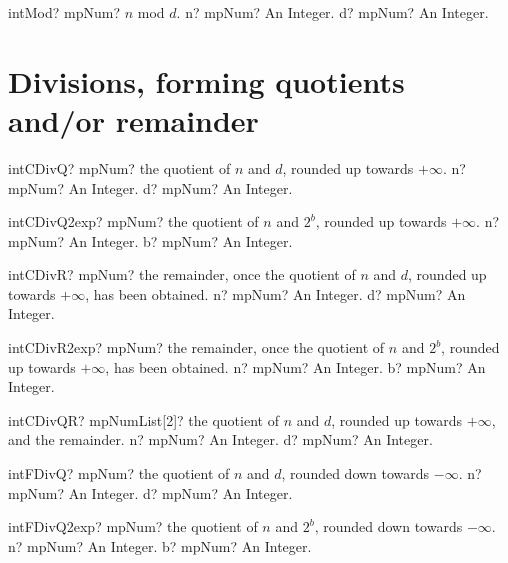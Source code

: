 \documentclass[12pt,a4paper,openany]{book}
\begin{document}
\begin{mpFunctionsExtract}
\mpFunctionTwo
{intMod? mpNum? $n$ mod $d$.}
{n? mpNum? An Integer.}
{d? mpNum? An Integer.}
\end{mpFunctionsExtract}

\section{Divisions, forming quotients and/or remainder}

\begin{mpFunctionsExtract}
\mpFunctionTwo
{intCDivQ? mpNum? the quotient of $n$ and $d$, rounded up towards $+\infty$.}
{n? mpNum? An Integer.}
{d? mpNum? An Integer.}
\end{mpFunctionsExtract}

\begin{mpFunctionsExtract}
\mpFunctionTwo
{intCDivQ2exp? mpNum? the quotient of $n$ and $2^b$, rounded up towards $+\infty$.}
{n? mpNum? An Integer.}
{b? mpNum? An Integer.}
\end{mpFunctionsExtract}

\begin{mpFunctionsExtract}
\mpFunctionTwo
{intCDivR? mpNum? the remainder, once the quotient of $n$ and $d$, rounded up towards $+\infty$, has been obtained.}
{n? mpNum? An Integer.}
{d? mpNum? An Integer.}
\end{mpFunctionsExtract}

\begin{mpFunctionsExtract}
\mpFunctionTwo
{intCDivR2exp? mpNum? the remainder, once the quotient of $n$ and $2^b$, rounded up towards $+\infty$, has been obtained.}
{n? mpNum? An Integer.}
{b? mpNum? An Integer.}
\end{mpFunctionsExtract}

\begin{mpFunctionsExtract}
\mpFunctionTwo
{intCDivQR? mpNumList[2]? the quotient of $n$ and $d$, rounded up towards $+\infty$, and the remainder.}
{n? mpNum? An Integer.}
{d? mpNum? An Integer.}
\end{mpFunctionsExtract}

\begin{mpFunctionsExtract}
\mpFunctionTwo
{intFDivQ? mpNum? the quotient of $n$ and $d$, rounded down towards $-\infty$.}
{n? mpNum? An Integer.}
{d? mpNum? An Integer.}
\end{mpFunctionsExtract}

\begin{mpFunctionsExtract}
\mpFunctionTwo
{intFDivQ2exp? mpNum? the quotient of $n$ and $2^b$, rounded down towards $-\infty$.}
{n? mpNum? An Integer.}
{b? mpNum? An Integer.}
\end{mpFunctionsExtract}
\end{document}
